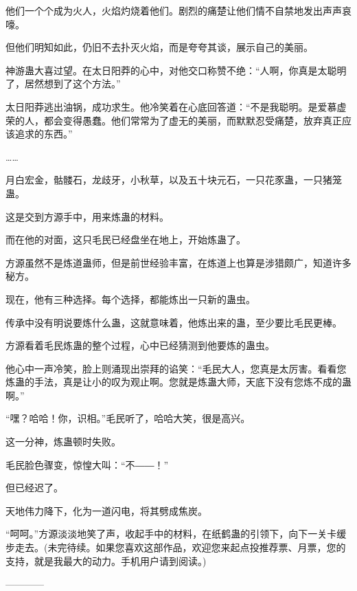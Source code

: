 \begin{this_body}
他们一个个成为火人，火焰灼烧着他们。剧烈的痛楚让他们情不自禁地发出声声哀嚎。

但他们明知如此，仍旧不去扑灭火焰，而是夸夸其谈，展示自己的美丽。

神游蛊大喜过望。在太日阳莽的心中，对他交口称赞不绝：“人啊，你真是太聪明了，居然想到了这个方法。”

太日阳莽逃出油锅，成功求生。他冷笑着在心底回答道：“不是我聪明。是爱慕虚荣的人，都会变得愚蠢。他们常常为了虚无的美丽，而默默忍受痛楚，放弃真正应该追求的东西。”

……

月白宏金，骷髅石，龙歧牙，小秋草，以及五十块元石，一只花豕蛊，一只猪笼蛊。

这是交到方源手中，用来炼蛊的材料。

而在他的对面，这只毛民已经盘坐在地上，开始炼蛊了。

方源虽然不是炼道蛊师，但是前世经验丰富，在炼道上也算是涉猎颇广，知道许多秘方。

现在，他有三种选择。每个选择，都能炼出一只新的蛊虫。

传承中没有明说要炼什么蛊，这就意味着，他炼出来的蛊，至少要比毛民更棒。

方源看着毛民炼蛊的整个过程，心中已经猜测到他要炼的蛊虫。

他心中一声冷笑，脸上则涌现出崇拜的谄笑：“毛民大人，您真是太厉害。看看您炼蛊的手法，真是让小的叹为观止啊。您就是炼蛊大师，天底下没有您炼不成的蛊啊。”

“嘿？哈哈！你，识相。”毛民听了，哈哈大笑，很是高兴。

这一分神，炼蛊顿时失败。

毛民脸色骤变，惊惶大叫：“不――！”

但已经迟了。

天地伟力降下，化为一道闪电，将其劈成焦炭。

“呵呵。”方源淡淡地笑了声，收起手中的材料，在纸鹤蛊的引领下，向下一关卡缓步走去。(未完待续。如果您喜欢这部作品，欢迎您来起点投推荐票、月票，您的支持，就是我最大的动力。手机用户请到阅读。)

------------

\end{this_body}

